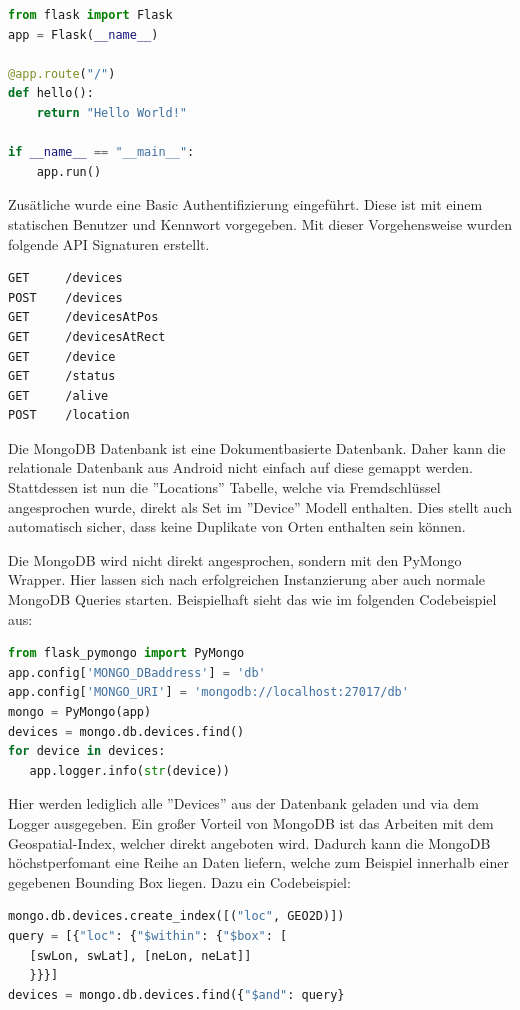 \documentclass[11pt,a4paper]{article}
\begin{document}
\begin{lstlisting}[language=Python]
from flask import Flask
app = Flask(__name__)

@app.route("/")
def hello():
    return "Hello World!"
    
if __name__ == "__main__":
    app.run()
\end{lstlisting}

\noindent Zusätliche wurde eine Basic Authentifizierung eingeführt. Diese ist mit einem statischen Benutzer und Kennwort vorgegeben.
Mit dieser Vorgehensweise wurden folgende API Signaturen erstellt. 

\begin{lstlisting}[]
GET     /devices
POST	/devices
GET     /devicesAtPos
GET     /devicesAtRect
GET     /device
GET     /status
GET     /alive
POST    /location
\end{lstlisting}

Die MongoDB Datenbank ist eine Dokumentbasierte Datenbank. Daher kann die relationale Datenbank aus Android nicht einfach auf diese gemappt werden. Stattdessen ist nun die ''Locations'' Tabelle, welche via Fremdschlüssel angesprochen wurde, direkt als Set im ''Device'' Modell enthalten. Dies stellt auch automatisch sicher, dass keine Duplikate von Orten enthalten sein können.

Die MongoDB wird nicht direkt angesprochen, sondern mit den PyMongo Wrapper. Hier lassen sich nach erfolgreichen Instanzierung aber auch normale MongoDB Queries starten. Beispielhaft sieht das wie im folgenden Codebeispiel aus:

\begin{lstlisting}[language=Python]
from flask_pymongo import PyMongo
app.config['MONGO_DBaddress'] = 'db'
app.config['MONGO_URI'] = 'mongodb://localhost:27017/db'
mongo = PyMongo(app)
devices = mongo.db.devices.find()
for device in devices:
   app.logger.info(str(device))
\end{lstlisting}

Hier werden lediglich alle ''Devices'' aus der Datenbank geladen und via dem Logger ausgegeben. 
Ein großer Vorteil von MongoDB ist das Arbeiten mit dem Geospatial-Index, welcher direkt angeboten wird. Dadurch kann die MongoDB höchstperfomant eine Reihe an Daten liefern, welche zum Beispiel innerhalb einer gegebenen Bounding Box liegen. Dazu ein Codebeispiel:

\begin{lstlisting}[language=Python]
mongo.db.devices.create_index([("loc", GEO2D)])
query = [{"loc": {"$within": {"$box": [
   [swLon, swLat], [neLon, neLat]]
   }}}]
devices = mongo.db.devices.find({"$and": query}
\end{lstlisting}
\end{document}
